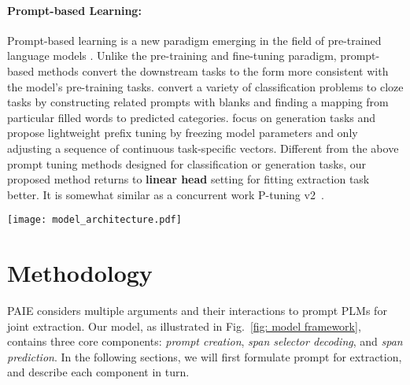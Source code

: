 \paragraph{Prompt-based Learning:}
Prompt-based learning is a new paradigm emerging in the field of pre-trained language models \cite {liu2021pretrain}. Unlike the pre-training and fine-tuning paradigm, prompt-based methods convert the downstream tasks to the form more consistent with the model's pre-training tasks. \citet{schick-schutze-2021-exploiting} convert a variety of classification problems to cloze tasks by constructing related prompts with blanks and finding a mapping from particular filled words to predicted categories. \citet{li-liang-2021-prefix} focus on generation tasks and propose lightweight prefix tuning by freezing model parameters and only adjusting a sequence of continuous task-specific vectors. Different from the above prompt tuning methods designed for classification or generation tasks, our proposed method returns to \textbf{linear head} setting for fitting extraction task better. It is somewhat similar as a concurrent work P-tuning v2~\cite{DBLP:journals/corr/abs-2110-07602}. \begin{figure*}[t]
    \centerline{\texttt{[image: model\_architecture.pdf]}}
    \caption{The overall architecture of PAIE. Given a context (about an event), PAIE first creates joint prompts based on its event type. Then the context and prompt are fed into the BART-Encoder and BART-Decoder to generate context representation and role-specific span selectors. Multiple span selectors extract argument spans from the context simultaneously. A bipartite matching loss finally optimizes the global span assignment.}

    \label{fig: model framework}
\end{figure*}

\section{Methodology}
\label{sec:method}

PAIE considers multiple arguments and their interactions to prompt PLMs for joint extraction. Our model, as illustrated in Fig.~\ref{fig: model framework}, contains three core components: \textit{prompt creation}, 
\textit{span selector decoding}, 
and \textit{span prediction}. In the following sections, we will first formulate prompt for extraction, and describe each component in turn.


